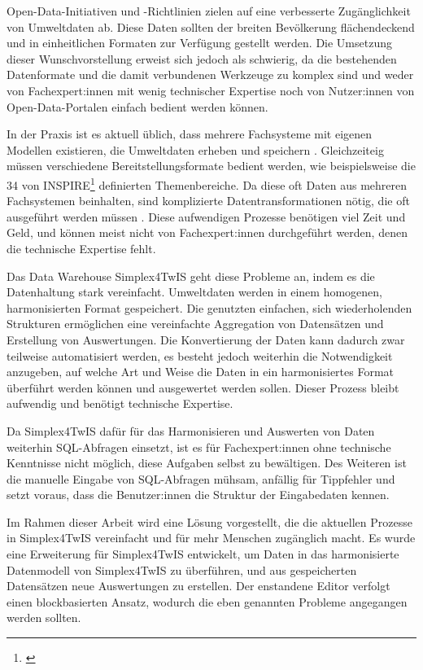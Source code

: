 Open-Data-Initiativen und -Richtlinien zielen auf eine verbesserte Zugänglichkeit von Umweltdaten ab. Diese Daten sollten der breiten Bevölkerung flächendeckend und in einheitlichen Formaten zur Verfügung gestellt werden. Die Umsetzung dieser Wunschvorstellung erweist sich jedoch als schwierig, da die bestehenden Datenformate und die damit verbundenen Werkzeuge zu komplex sind und weder von Fachexpert:innen mit wenig technischer Expertise noch von Nutzer:innen von Open-Data-Portalen einfach bedient werden können.

In der Praxis ist es aktuell üblich, dass mehrere Fachsysteme mit eigenen Modellen existieren, die Umweltdaten erheben und speichern \parencite{grossmannEnvVisioUniverselle2021}. Gleichzeiteig müssen verschiedene Bereitstellungsformate bedient werden, wie beispielsweise die 34 von INSPIRE\footnote{\textcite{inspireRichtlinie20072007}} definierten Themenbereiche. Da diese oft Daten aus mehreren Fachsystemen beinhalten, sind komplizierte Datentransformationen nötig, die oft ausgeführt werden müssen \parencite{grossmannEnvVisioUniverselle2021}. Diese aufwendigen Prozesse benötigen viel Zeit und Geld, und können meist nicht von Fachexpert:innen durchgeführt werden, denen die technische Expertise fehlt.

\pskip
Das Data Warehouse Simplex4TwIS geht diese Probleme an, indem es die Datenhaltung stark vereinfacht. Umweltdaten werden in einem homogenen, harmonisierten Format gespeichert. Die genutzten einfachen, sich wiederholenden Strukturen ermöglichen eine vereinfachte Aggregation von Datensätzen und Erstellung von Auswertungen. Die Konvertierung der Daten kann dadurch zwar teilweise automatisiert werden, es besteht jedoch weiterhin die Notwendigkeit anzugeben, auf welche Art und Weise die Daten in ein harmonisiertes Format überführt werden können und ausgewertet werden sollen. Dieser Prozess bleibt aufwendig und benötigt technische Expertise.

Da Simplex4TwIS dafür für das Harmonisieren und Auswerten von Daten weiterhin \acs{SQL}-Abfragen einsetzt, ist es für Fachexpert:innen ohne technische Kenntnisse nicht möglich, diese Aufgaben selbst zu bewältigen. Des Weiteren ist die manuelle Eingabe von \acs{SQL}-Abfragen mühsam, anfällig für Tippfehler und setzt voraus, dass die Benutzer:innen die Struktur der Eingabedaten kennen.

\pskip
Im Rahmen dieser Arbeit wird eine Lösung vorgestellt, die die aktuellen Prozesse in Simplex4TwIS vereinfacht und für mehr Menschen zugänglich macht. Es wurde eine Erweiterung für Simplex4TwIS entwickelt, um Daten in das harmonisierte Datenmodell von Simplex4TwIS zu überführen, und aus gespeicherten Datensätzen neue Auswertungen zu erstellen. Der enstandene Editor verfolgt einen blockbasierten Ansatz, wodurch die eben genannten Probleme angegangen werden sollten.

